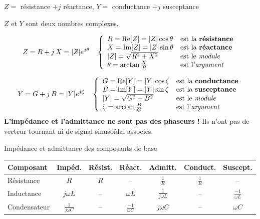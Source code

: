 \begin{frame}[allowframebreaks]{\Large $Z =$ résistance $+ j$ réactance, $Y = $ conductance $+ j$ susceptance}
	
	$Z$ et $Y$ sont deux nombres complexes.
	
	\[Z=R+j\, X = |Z|e^{j\theta}\quad 
	\left\{
	\begin{array}{ll}
	R = \text{Re}[Z] = |Z|\cos \theta & \text{est la {\bf résistance}}\\
	X = \text{Im}[Z] = |Z|\sin \theta & \text{est la {\bf réactance}}\\
	|Z| = \sqrt{R^2+X^2} & \text{est le {\em module}}\\
	\theta = \arctan \frac{X}{R} & \text{est l'{\em argument}}
	\end{array}\right. \]
	
	
	\vspace*{2mm}
	\[Y=G+j\, B = |Y|e^{j\zeta} \quad
	\left\{\begin{array}{ll}
	G = \text{Re}[Y] = |Y|\cos \zeta & \text{est la {\bf conductance}}\\
	B = \text{Im}[Y] = |Y|\sin \zeta & \text{est la {\bf susceptance}}\\
	|Y| = \sqrt{G^2+B^2} & \text{est le {\em module}}\\
	\zeta = \arctan \frac{B}{G} & \text{est l'{\em argument}}\\
	\end{array}\right.\]
	\vfill
	\textbf{L'impédance et l'admittance ne sont pas des phaseurs !} Ils n'ont pas de vecteur tournant  ni de signal sinusoïdal associés.
\end{frame}


\begin{frame}{Impédance et admittance des composants de base}
	
	\begin{center}
		\begin{tabular}{l|ccc|ccc}
      \toprule
			Composant & Impéd. & Résist. & Réact. & Admitt. &
			Conduct. & Suscept. \\ 
      \midrule
			Résistance & $R$ & $R$ & -- & $\frac{1}{R}$ &   $\frac{1}{R}$ & --\\
			Inductance & $j\omega L$ & -- & $\omega L$ & $\frac{1}{j\omega L}$ &
			-- & $\frac{-1}{\omega L}$\\
			Condensateur & $\frac{1}{j\omega C}$ & -- & $\frac{-1}{\omega C}$ 
			& $j\omega C$ & -- &  $\omega C$ \\
      \bottomrule
		\end{tabular}
	\end{center}
\end{frame}


